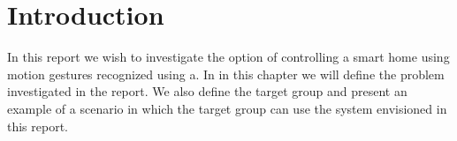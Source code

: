 \chapter{Introduction}
\label{chap:introduction}

In this report we wish to investigate the option of controlling a smart home using motion gestures recognized using a. In in this chapter we will define the problem investigated in the report. We also define the target group and present an example of a scenario in which the target group can use the system envisioned in this report.







% 


